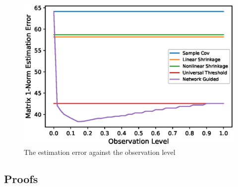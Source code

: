 \begin{figure}
    \centering
    \includegraphics{asset/observation-level-1.eps}
    \caption{The estimation error against the observation level}
    \label{fig:3}
\end{figure}





\subsection{Proofs}


